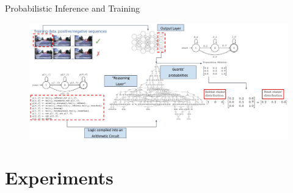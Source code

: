 \documentclass[10pt, aspectratio=169]{beamer}
\begin{document}
\begin{frame}{Probabilistic Inference and Training}
    \begin{figure}
        \includegraphics[width=\textwidth]{contents/images/NeSy_training.jpg}
    \end{figure}
\end{frame}


\section{Experiments}
{
    \begin{frame}
        \sectionpage%
    \end{frame}
}
\end{document}
